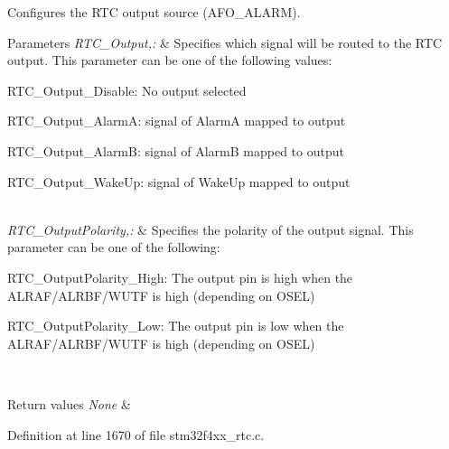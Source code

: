 Configures the R\-T\-C output source (A\-F\-O\-\_\-\-A\-L\-A\-R\-M). 


\begin{DoxyParams}{Parameters}
{\em R\-T\-C\-\_\-\-Output,\-:} & Specifies which signal will be routed to the R\-T\-C output. This parameter can be one of the following values\-: \begin{DoxyItemize}
\item R\-T\-C\-\_\-\-Output\-\_\-\-Disable\-: No output selected \item R\-T\-C\-\_\-\-Output\-\_\-\-Alarm\-A\-: signal of Alarm\-A mapped to output \item R\-T\-C\-\_\-\-Output\-\_\-\-Alarm\-B\-: signal of Alarm\-B mapped to output \item R\-T\-C\-\_\-\-Output\-\_\-\-Wake\-Up\-: signal of Wake\-Up mapped to output \end{DoxyItemize}
\\
\hline
{\em R\-T\-C\-\_\-\-Output\-Polarity,\-:} & Specifies the polarity of the output signal. This parameter can be one of the following\-: \begin{DoxyItemize}
\item R\-T\-C\-\_\-\-Output\-Polarity\-\_\-\-High\-: The output pin is high when the A\-L\-R\-A\-F/\-A\-L\-R\-B\-F/\-W\-U\-T\-F is high (depending on O\-S\-E\-L) \item R\-T\-C\-\_\-\-Output\-Polarity\-\_\-\-Low\-: The output pin is low when the A\-L\-R\-A\-F/\-A\-L\-R\-B\-F/\-W\-U\-T\-F is high (depending on O\-S\-E\-L) \end{DoxyItemize}
\\
\hline
\end{DoxyParams}

\begin{DoxyRetVals}{Return values}
{\em None} & \\
\hline
\end{DoxyRetVals}


Definition at line 1670 of file stm32f4xx\-\_\-rtc.\-c.

